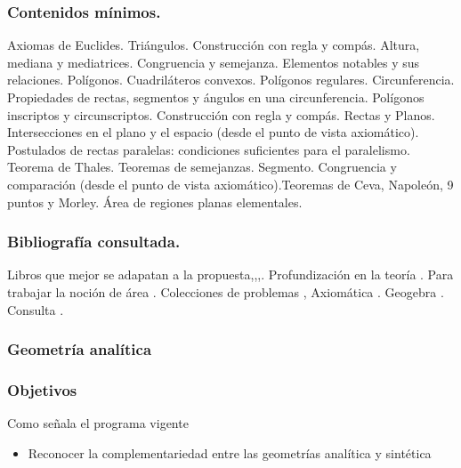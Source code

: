 \documentclass[a4paper,10pt,BCOR10mm,oneside,headsepline]{scrbook}
\begin{document}
\subsubsection{Contenidos mínimos.} Axiomas de Euclides. Triángulos. Construcción con regla y compás. Altura, mediana y mediatrices. Congruencia y semejanza. Elementos notables y sus relaciones.  Polígonos. Cuadriláteros convexos. Polígonos regulares. Circunferencia.
 Propiedades de rectas, segmentos y ángulos en una circunferencia. Polígonos inscriptos y circunscriptos. Construcción con regla y compás. Rectas y Planos. Intersecciones en el plano y el espacio (desde el punto de vista axiomático). Postulados de rectas paralelas: condiciones suficientes para el paralelismo. Teorema de Thales. Teoremas de semejanzas. Segmento. Congruencia y comparación (desde el punto de vista axiomático).Teoremas de Ceva, Napoleón, 9 puntos y Morley. Área de regiones planas elementales. 
 
\subsubsection{Bibliografía consultada.} Libros que mejor se adapatan a la propuesta\linebreak \cite{AllanBerele41},\cite{RogerFenn248},\cite{RobinHartshorne131},\cite{AlfredS.Posamentier49}. Profundización en la teoría \cite{O.Bottema149,CharlesStanleyOgilvy129}. Para trabajar la noción de  área \cite{AllanBerele41}. Colecciones de problemas \cite{M.N.Aref52,EvanChen132}, Axiomática \cite{GerardA.Venema145}\linebreak\cite{RobinHartshorne131}. Geogebra \cite{GerardA.Venema145}. Consulta \cite{H.S.M.Coxeter226,H.S.M.Coxeter35,MatthewHarvey261,RogerA.Johnson42}.



\subsubsection{Geometría analítica} 
\subsubsection{Objetivos} 
Como señala el programa vigente
\begin{itemize}
  \item  Reconocer la complementariedad entre las geometrías analítica y
sintética
\end{itemize}
\end{document}
